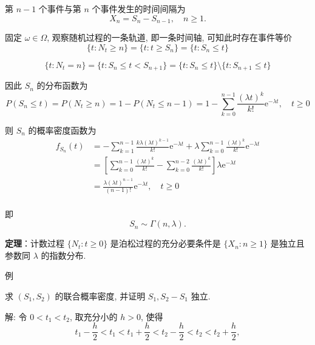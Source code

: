 \documentclass[openany]{ctexbook}
\theoremstyle{kaiti}
\theoremstyle{normal}
\begin{document}
  第 $n-1$ 个事件与第 $n$ 个事件发生的时间间隔为
\begin{equation}
    X_n=S_n-S_{n-1},\quad n\geqslant1.
\end{equation}
  
  固定 $\omega\in\Omega$, 观察随机过程的一条轨道, 即一条时间轴, 可知此时存在事件等价
\begin{equation}
    \{t:N_t\geqslant n\}=\{t:t\geqslant S_n\}=\{t:S_n\leqslant t\}
\end{equation}
  
\begin{equation}
    \{t:N_t=n\}=\{t:S_n\leqslant t< S_{n+1}\}=\{t:S_n\leqslant t\}\setminus\{t:S_{n+1}\leqslant t\}
\end{equation}
  
  因此 $S_n$ 的分布函数为
\begin{equation}
    P(S_n\leqslant t)=P(N_t\geqslant n)=1-P(N_t\leqslant n-1)=1-\sum_{k=0}^{n-1}\frac{(\lambda t)^k}{k!}\mathrm{e}^{-\lambda t},\quad t\geqslant0
\end{equation}
  
  则 $S_n$ 的概率密度函数为
\begin{equation}
    \begin{aligned}
      f_{S_n}(t)
      &=-\sum_{k=1}^{n-1}\frac{k\lambda(\lambda t)^{k-1}}{k!}\mathrm{e}^{-\lambda t}+\lambda\sum_{k=0}^{n-1}\frac{(\lambda t)^k}{k!}\mathrm{e}^{-\lambda t}\\
      &=\left[\sum_{k=0}^{n-1}\frac{(\lambda t)^k}{k!}-\sum_{k=0}^{n-2}\frac{(\lambda t)^k}{k!}\right]\lambda\mathrm{e}^{-\lambda t}\\
      &=\frac{\lambda(\lambda t)^{n-1}}{(n-1)!}\mathrm{e}^{-\lambda t},\quad t\geqslant0\\
    \end{aligned}
\end{equation}
  
  即
\begin{equation}
    S_n\sim\Gamma(n,\lambda).
\end{equation}
  
  \textbf{定理}：计数过程 $\{N_t:t\geqslant0\}$ 是泊松过程的充分必要条件是 $\{X_n:n\geqslant1\}$ 是独立且参数同 $\lambda$ 的指数分布.
  
  例
  
  求 $(S_1,S_2)$ 的联合概率密度, 并证明 $S_1,S_2-S_1$ 独立.
  
  解: 令 $0< t_1 < t_2$, 取充分小的 $h>0$, 使得
\begin{equation}
    t_1-\frac{h}{2}< t_1 < t_1+\frac{h}{2} < t_2-\frac{h}{2} < t_2 < t_2+\frac{h}{2},
\end{equation}
  
\end{document}
